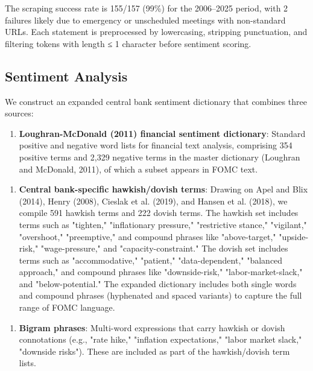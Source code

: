 \documentclass[12pt]{article}
\begin{document}
The scraping success rate is 155/157 (99\%) for the 2006--2025 period, with 2 failures likely due to emergency or unscheduled meetings with non-standard URLs. Each statement is preprocessed by lowercasing, stripping punctuation, and filtering tokens with length ≤ 1 character before sentiment scoring.

\subsection{Sentiment Analysis}

We construct an expanded central bank sentiment dictionary that combines three sources:

\begin{enumerate}
\item \textbf{Loughran-McDonald (2011) financial sentiment dictionary}: Standard positive and negative word lists for financial text analysis, comprising 354 positive terms and 2,329 negative terms in the master dictionary (Loughran and McDonald, 2011), of which a subset appears in FOMC text.
\end{enumerate}

\begin{enumerate}
\item \textbf{Central bank-specific hawkish/dovish terms}: Drawing on Apel and Blix (2014), Henry (2008), Cieslak et al. (2019), and Hansen et al. (2018), we compile 591 hawkish terms and 222 dovish terms. The hawkish set includes terms such as "tighten," "inflationary pressure," "restrictive stance," "vigilant," "overshoot," "preemptive," and compound phrases like "above-target," "upside-risk," "wage-pressure," and "capacity-constraint." The dovish set includes terms such as "accommodative," "patient," "data-dependent," "balanced approach," and compound phrases like "downside-risk," "labor-market-slack," and "below-potential." The expanded dictionary includes both single words and compound phrases (hyphenated and spaced variants) to capture the full range of FOMC language.
\end{enumerate}

\begin{enumerate}
\item \textbf{Bigram phrases}: Multi-word expressions that carry hawkish or dovish connotations (e.g., "rate hike," "inflation expectations," "labor market slack," "downside risks"). These are included as part of the hawkish/dovish term lists.
\end{enumerate}
\end{document}
